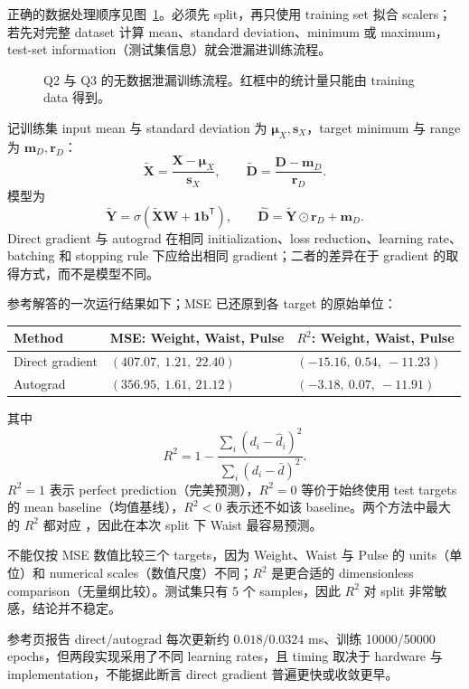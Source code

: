 \begin{checkedsolution}
正确的数据处理顺序见图~\ref{fig:sc4001-tut03-pipeline}。必须先 split，再只使用 training set 拟合 scalers；若先对完整 dataset 计算 mean、standard deviation、minimum 或 maximum，test-set information（测试集信息）就会泄漏进训练流程。

\begin{figure}[htbp]
  \centering
  \resizebox{0.98\textwidth}{!}{}
  \caption{Q2 与 Q3 的无数据泄漏训练流程。红框中的统计量只能由 training data 得到。}
  \label{fig:sc4001-tut03-pipeline}
\end{figure}

记训练集 input mean 与 standard deviation 为 $\bm\mu_X,\bm s_X$，target minimum 与 range 为 $\bm m_D,\bm r_D$：
\[
  \tilde{\bm X}=\frac{\bm X-\bm\mu_X}{\bm s_X},
  \qquad
  \tilde{\bm D}=\frac{\bm D-\bm m_D}{\bm r_D}.
\]
模型为
\[
  \tilde{\bm Y}=\sigma(\tilde{\bm X}\bm W+\bm1\bm b^{\mathsf T}),
  \qquad
  \hat{\bm D}=\tilde{\bm Y}\odot\bm r_D+\bm m_D.
\]
Direct gradient 与 autograd 在相同 initialization、loss reduction、learning rate、batching 和 stopping rule 下应给出相同 gradient；二者的差异在于 gradient 的取得方式，而不是模型不同。

参考解答的一次运行结果如下；MSE 已还原到各 target 的原始单位：
\begin{center}
\small
\begin{tabularx}{0.96\textwidth}{@{}lXX@{}}
  \toprule
  Method & MSE: Weight, Waist, Pulse & $R^2$: Weight, Waist, Pulse \\
  \midrule
  Direct gradient
    & $(407.07,\ 1.21,\ 22.40)$
    & $(-15.16,\ 0.54,\ -11.23)$ \\
  Autograd
    & $(356.95,\ 1.61,\ 21.12)$
    & $(-3.18,\ 0.07,\ -11.91)$ \\
  \bottomrule
\end{tabularx}
\end{center}
其中
\[
  R^2=1-\frac{\sum_i(d_i-\hat d_i)^2}{\sum_i(d_i-\bar d)^2}.
\]
$R^2=1$ 表示 perfect prediction（完美预测），$R^2=0$ 等价于始终使用 test targets 的 mean baseline（均值基线），$R^2<0$ 表示还不如该 baseline。两个方法中最大的 $R^2$ 都对应 ，因此在本次 split 下 Waist 最容易预测。

不能仅按 MSE 数值比较三个 targets，因为 Weight、Waist 与 Pulse 的 units（单位）和 numerical scales（数值尺度）不同；$R^2$ 是更合适的 dimensionless comparison（无量纲比较）。测试集只有 5 个 samples，因此 $R^2$ 对 split 非常敏感，结论并不稳定。

参考页报告 direct/autograd 每次更新约 $0.018/0.0324$ ms、训练 10000/50000 epochs，但两段实现采用了不同 learning rates，且 timing 取决于 hardware 与 implementation，不能据此断言 direct gradient 普遍更快或收敛更早。
\end{checkedsolution}

